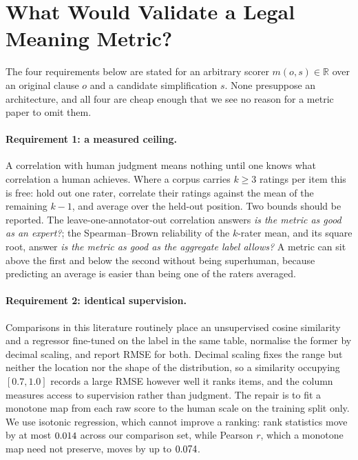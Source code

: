\documentclass[11pt]{article}
\begin{document}
\section{What Would Validate a Legal Meaning Metric?}
\label{sec:protocol}

The four requirements below are stated for an arbitrary scorer
$m(o,s) \in \mathbb{R}$ over an original clause $o$ and a candidate
simplification $s$. None presuppose an architecture, and all four are cheap
enough that we see no reason for a metric paper to omit them.

\paragraph{Requirement 1: a measured ceiling.}
A correlation with human judgment means nothing until one knows what
correlation a human achieves. Where a corpus carries $k \geq 3$ ratings per item
this is free: hold out one rater, correlate their ratings against the mean of
the remaining $k-1$, and average over the held-out position. Two bounds should
be reported. The leave-one-annotator-out correlation answers \emph{is the metric
as good as an expert?}; the Spearman--Brown reliability of the $k$-rater mean,
and its square root, answer \emph{is the metric as good as the aggregate label
allows?} A metric can sit above the first and below the second without being
superhuman, because predicting an average is easier than being one of the raters
averaged.

\paragraph{Requirement 2: identical supervision.}
Comparisons in this literature routinely place an unsupervised cosine similarity
and a regressor fine-tuned on the label in the same table, normalise the former
by decimal scaling, and report RMSE for both. Decimal scaling fixes the range
but neither the location nor the shape of the distribution, so a similarity
occupying $[0.7,1.0]$ records a large RMSE however well it ranks items, and the
column measures access to supervision rather than judgment. The repair is to fit
a monotone map from each raw score to the human
scale on the training split only. We use isotonic regression, which cannot
improve a ranking: rank
statistics move by at most $0.014$ across our comparison set, while
Pearson $r$, which a monotone map need not preserve, moves by up to
$0.074$.
\end{document}
